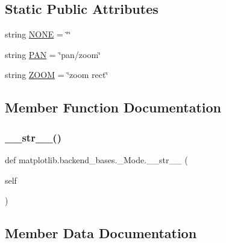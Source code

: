 \subsection*{Static Public Attributes}
\begin{DoxyCompactItemize}
\item 
string \hyperlink{classmatplotlib_1_1backend__bases_1_1__Mode_a05224bb4a65dabf445331fae896fc733}{N\+O\+NE} = \char`\"{}\char`\"{}
\item 
string \hyperlink{classmatplotlib_1_1backend__bases_1_1__Mode_a359b8e8d70b5bff0ccb2d06c7b8dbccf}{P\+AN} = \char`\"{}pan/zoom\char`\"{}
\item 
string \hyperlink{classmatplotlib_1_1backend__bases_1_1__Mode_a1c802267dc855d6c08d02dea750a8991}{Z\+O\+OM} = \char`\"{}zoom rect\char`\"{}
\end{DoxyCompactItemize}


\subsection{Member Function Documentation}
\mbox{\label{classmatplotlib_1_1backend__bases_1_1__Mode_a80d8df2886ff85c08322a99c84a183c3}} 
\subsubsection{\texorpdfstring{\+\_\+\+\_\+str\+\_\+\+\_\+()}{\_\_str\_\_()}}
{\footnotesize\ttfamily def matplotlib.\+backend\+\_\+bases.\+\_\+\+Mode.\+\_\+\+\_\+str\+\_\+\+\_\+ (\begin{DoxyParamCaption}\item[{}]{self }\end{DoxyParamCaption})}



\subsection{Member Data Documentation}
\mbox{\label{classmatplotlib_1_1backend__bases_1_1__Mode_a05224bb4a65dabf445331fae896fc733}} 
